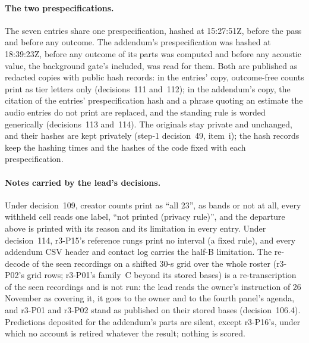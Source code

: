 \paragraph{The two prespecifications.} The seven entries share one prespecification, hashed at 15:27:51Z, before the
pass and before any outcome. The addendum's prespecification was hashed at 18:39:23Z, before any outcome of its parts was
computed and before any acoustic value, the background gate's included, was read for them. Both are published as
redacted copies with public hash records: in the entries' copy, outcome-free counts print as tier letters only
(decisions~111 and~112); in the addendum's copy, the citation of the entries' prespecification hash and a phrase quoting
an estimate the audio entries do not print are replaced, and the standing rule is worded generically (decisions~113 and~114). The originals stay private and
unchanged, and their hashes are kept privately (step-1 decision~49, item~i); the hash records keep the hashing times and
the hashes of the code fixed with each prespecification.

\paragraph{Notes carried by the lead's decisions.} Under decision~109, creator counts print as ``all 23'', as bands or not
at all, every withheld cell reads one label, ``not printed (privacy rule)'', and the departure above is printed with its
reason and its limitation in every entry. Under decision~114, r3-P15's reference rungs print no interval (a fixed rule),
and every addendum CSV header and contact log carries the half-B limitation. The re-decode of the seen recordings on a
shifted 30-s grid over the whole roster (r3-P02's grid rows; r3-P01's family~C beyond its stored bases) is a
re-transcription of the seen recordings and is not run: the lead reads the owner's instruction of 26 November as covering
it, it goes to the owner and to the fourth panel's agenda, and r3-P01 and r3-P02 stand as published on their stored
bases (decision~106.4). Predictions deposited for the addendum's parts are silent, except r3-P16's, under which no account
is retired whatever the result; nothing is scored.

